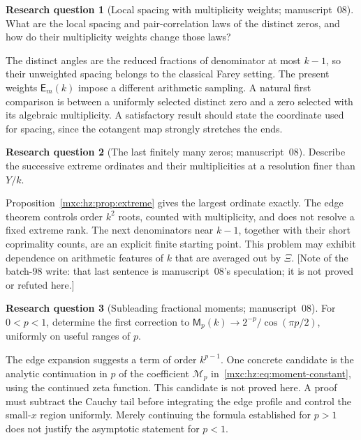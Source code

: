 \documentclass[11pt]{article}
\numberwithin{equation}{section}
\theoremstyle{definition}
\newtheorem{question}{Research question}
\theoremstyle{remark}
\begin{document}
\begin{question}[Local spacing with multiplicity weights; manuscript~08]\label{mxc:hz:q:spacing}
What are the local spacing and pair-correlation laws of the distinct
zeros, and how do their multiplicity weights change those laws?
\end{question}

The distinct angles are the reduced fractions of denominator at most
$k-1$, so their unweighted spacing belongs to the classical Farey setting.
The present weights $\mathsf E_m(k)$ impose a different arithmetic
sampling. A natural first comparison is between a uniformly selected
distinct zero and a zero selected with its algebraic multiplicity. A
satisfactory result should state the coordinate used for spacing, since
the cotangent map strongly stretches the ends.

\begin{question}[The last finitely many zeros; manuscript~08]\label{mxc:hz:q:last-zeros}
Describe the successive extreme ordinates and their multiplicities at a
resolution finer than $Y/k$.
\end{question}

Proposition~\ref{mxc:hz:prop:extreme} gives the largest ordinate exactly.
The edge theorem controls order $k^2$ roots, counted with multiplicity, and
does not resolve a fixed extreme rank. The next denominators near $k-1$,
together with their short coprimality counts, are an explicit finite
starting point. This problem may exhibit dependence on arithmetic features
of $k$ that are averaged out by $\Xi$. [Note of the batch-98 write: that
last sentence is manuscript~08's speculation; it is not proved or
refuted here.]

\begin{question}[Subleading fractional moments; manuscript~08]\label{mxc:hz:q:fractional}
For $0<p<1$, determine the first correction to
$\mathsf M_p(k)\to2^{-p}/\cos(\pi p/2)$, uniformly on useful ranges of $p$.
\end{question}

The edge expansion suggests a term of order $k^{p-1}$. One concrete
candidate is the analytic continuation in $p$ of the coefficient
$\mathcal M_p$ in~\eqref{mxc:hz:eq:moment-constant}, using the continued
zeta function. This candidate is not proved here. A proof must subtract the
Cauchy tail before integrating the edge profile and control the
small-$x$ region uniformly. Merely continuing the formula established for
$p>1$ does not justify the asymptotic statement for $p<1$.
\end{document}

